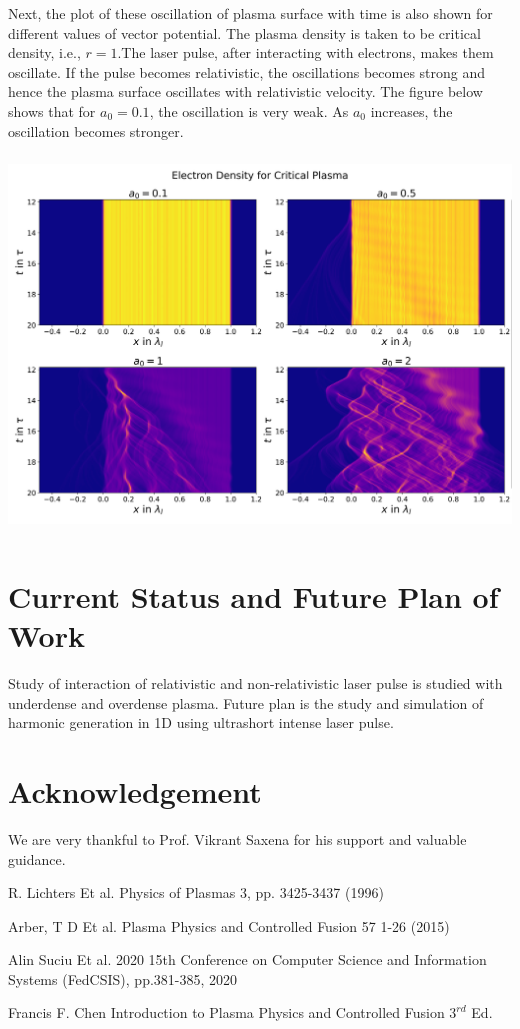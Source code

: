 \documentclass[]{article}
\begin{document}
Next, the plot of these oscillation of plasma surface with time is also shown for different values of vector potential. The plasma density is taken to be critical density, i.e., $r=1$.The laser pulse, after interacting with electrons, makes them oscillate. If the pulse becomes relativistic, the oscillations becomes strong and hence the plasma surface oscillates with relativistic velocity.
The figure below shows that for $a_0=0.1$, the oscillation is very weak. As $a_0$ increases, the oscillation becomes stronger.
\noindent
\begin{center}
    \includegraphics[height=10cm, width=17cm]{density.png}

\end{center}
\section{Current Status and Future Plan of Work}
Study of interaction of relativistic and non-relativistic laser pulse is studied with underdense and overdense plasma. Future plan is the study and simulation of harmonic generation in 1D using ultrashort intense laser pulse.
\section{Acknowledgement}
We are very thankful to Prof. Vikrant Saxena for his support and valuable guidance.
\begin{thebibliography}{9}
    R. Lichters Et al. Physics of Plasmas 3, pp. 3425-3437 (1996)

    Arber, T D Et al. Plasma Physics and Controlled Fusion 57 1-26 (2015)

    Alin Suciu Et al. 2020 15th Conference on Computer Science and Information Systems (FedCSIS), pp.381-385, 2020

    Francis F. Chen
    Introduction to Plasma Physics and Controlled Fusion $3^{rd}$ Ed.

\end{thebibliography}

\end{document}
